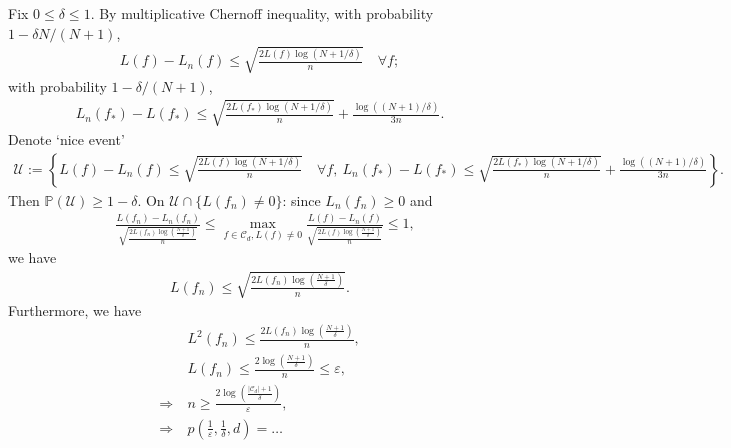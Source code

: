 \documentclass[twoside]{article}
\begin{document}
Fix $0\le \delta \le 1$. By multiplicative Chernoff inequality, with probability $1 - \delta N/(N+1)$, 
\begin{align*}
    L(f) - L_n(f) \le \sqrt{ \frac{ 2L(f) \log(N+1/\delta ) }{ n } } \quad \forall f;
\end{align*}
with probability $1-\delta/(N+1)$,
\begin{align*}
    L_n(f_*) - L(f_*) \le \sqrt{ \frac{ 2L(f_*) \log(N+1/\delta ) }{ n } } + \frac{ \log((N+1)/\delta) }{3n}.
\end{align*}
Denote `nice event'
\begin{align*}
    \mathcal{U}:= \left\{  L(f) - L_n(f) \le \sqrt{ \frac{ 2L(f) \log(N+1/\delta ) }{ n } } \quad \forall f,\   L_n(f_*) - L(f_*) \le \sqrt{ \frac{ 2L(f_*) \log(N+1/\delta ) }{ n } } + \frac{ \log((N+1)/\delta) }{3n} \right\}.
\end{align*}
Then $\mathbb{P}(\mathcal{U}) \ge 1-\delta$.
On $\mathcal{U} \cap \{ L(f_n) \ne 0 \}$: since $L_n(f_n) \ge 0$ and
\begin{align*}
    &
    \frac{ L(f_n) - L_n(f_n) }{ \sqrt{ \frac{ 2L(f_n) \log\left(\frac{N+1}{\delta}\right) }{n} } }
    \le \max_{ f\in \mathcal{C}_d, L(f)\ne 0 }
    \frac{ L(f) - L_n(f) }{ \sqrt{ \frac{ 2L(f) \log\left(\frac{N+1}{\delta}\right) }{n} } } \le 1,
\end{align*}
we have
\begin{align*}
    L(f_n) \le \sqrt{ \frac{ 2L(f_n) \log\left(\frac{N+1}{\delta}\right) }{n} }.
\end{align*}
Furthermore, we have
\begin{align*}
    & L^2(f_n) \le \frac{ 2L(f_n) \log\left(\frac{N+1}{\delta}\right) }{n} ,
    \\& L(f_n) \le \frac{ 2 \log\left(\frac{N+1}{\delta}\right) }{n} \le \varepsilon,
    \\ \Rightarrow~ &
    n \ge \frac{  2\log\left( \frac{ |\mathcal{C}_{d}|+1 }{\delta} \right) }{\varepsilon},
    \\ \Rightarrow~ &
    p\left( \frac{1}{\varepsilon}, \frac{1}{\delta}, d \right) = \ldots
\end{align*}
\end{document}
